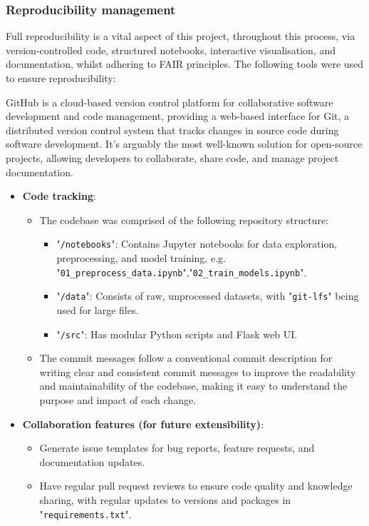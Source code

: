 
\subsubsection*{Reproducibility management}
Full reproducibility is a vital aspect of this project, throughout this process, via version-controlled code, structured notebooks, interactive visualisation, and documentation, whilst adhering to FAIR principles. The following tools were used to ensure reproducibility:\newline

\noindent GitHub is a cloud-based version control platform for collaborative software development and code management, providing a web-based interface for Git, a distributed version control system that tracks changes in source code during software development. It's arguably the most well-known solution for open-source projects, allowing developers to collaborate, share code, and manage project documentation.

\begin{itemize}
  \item \textbf{Code tracking}:
  \begin{itemize}
    \item The codebase was comprised of the following repository structure:
    \begin{itemize}
      \item "\texttt{/notebooks}": Contains Jupyter notebooks for data exploration, preprocessing, and model training, e.g. "\texttt{01\_preprocess\_data.ipynb}",\newline "\texttt{02\_train\_models.ipynb}".
      \item "\texttt{/data}": Consists of raw, unprocessed datasets, with "\texttt{git-lfs}" being used for large files.
      \item "\texttt{/src}": Has modular Python scripts and Flask web UI.
    \end{itemize}
    \item The commit messages follow a conventional commit description for writing clear and consistent commit messages to improve the readability and maintainability of the codebase, making it easy to understand the purpose and impact of each change.
  \end{itemize}
  \item \textbf{Collaboration features (for future extensibility)}:
  \begin{itemize}
    \item Generate issue templates for bug reports, feature requests, and documentation updates.
    \item Have regular pull request reviews to ensure code quality and knowledge sharing, with regular updates to versions and packages in "\texttt{requirements.txt}".
  \end{itemize}
\end{itemize}

